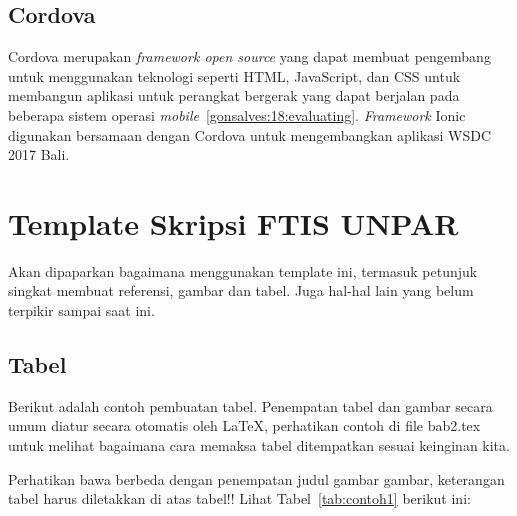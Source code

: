 \subsection{Cordova}
\label{subsec:cordova}
Cordova merupakan {\it framework open source} yang dapat membuat pengembang untuk menggunakan teknologi seperti HTML, JavaScript, dan CSS untuk membangun aplikasi untuk perangkat bergerak yang dapat berjalan pada beberapa sistem operasi {\it mobile}~\ref{gonsalves:18:evaluating}. {\it Framework} Ionic digunakan bersamaan dengan Cordova untuk mengembangkan aplikasi WSDC 2017 Bali. 

%

\section{Template Skripsi FTIS UNPAR}
\label{sec:template}
 
Akan dipaparkan bagaimana menggunakan template ini, termasuk petunjuk singkat membuat referensi, gambar dan tabel.
Juga hal-hal lain yang belum terpikir sampai saat ini. 
 

\subsection{Tabel}  
Berikut adalah contoh pembuatan tabel. 
Penempatan tabel dan gambar secara umum diatur secara otomatis oleh \LaTeX{}, perhatikan contoh di file bab2.tex untuk melihat bagaimana cara memaksa tabel ditempatkan sesuai keinginan kita.

Perhatikan bawa berbeda dengan penempatan judul gambar gambar, keterangan tabel harus diletakkan di atas tabel!!
Lihat Tabel~\ref{tab:contoh1} berikut ini:

